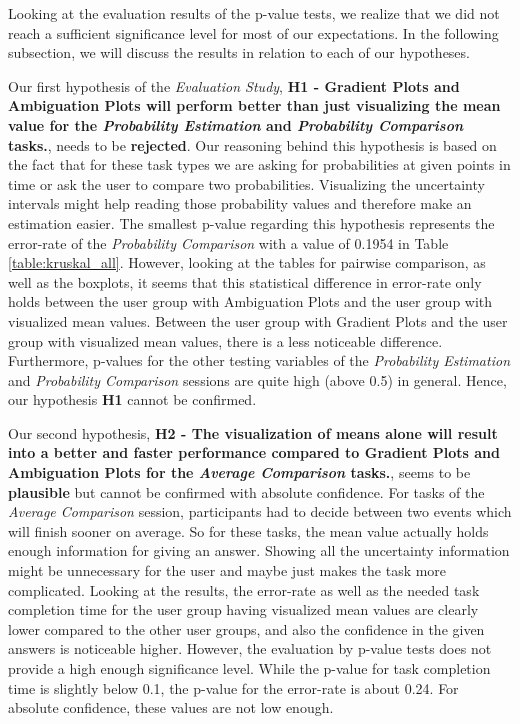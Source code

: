 Looking at the evaluation results of the p-value tests, we realize that we did not reach a sufficient significance level for most of our expectations. In the following subsection, we will discuss the results in relation to each of our hypotheses. \par \medskip

Our first hypothesis of the \textit{Evaluation Study}, \textbf{H1 - Gradient Plots and Ambiguation Plots will perform better than just visualizing the mean value for the \textit{Probability Estimation} and \textit{Probability Comparison} tasks.}, needs to be \textbf{rejected}. Our reasoning behind this hypothesis is based on the fact that for these task types we are asking for probabilities at given points in time or ask the user to compare two probabilities. Visualizing the uncertainty intervals might help reading those probability values and therefore make an estimation easier. The smallest p-value regarding this hypothesis represents the error-rate of the \textit{Probability Comparison} with a value of 0.1954 in Table \ref{table:kruskal_all}. However, looking at the tables for pairwise comparison, as well as the boxplots, it seems that this statistical difference in error-rate only holds between the user group with Ambiguation Plots and the user group with visualized mean values. Between the user group with Gradient Plots and the user group with visualized mean values, there is a less noticeable difference. Furthermore, p-values for the other testing variables of the \textit{Probability Estimation} and \textit{Probability Comparison} sessions are quite high (above 0.5) in general. Hence, our hypothesis \textbf{H1} cannot be confirmed. \par \medskip

Our second hypothesis, \textbf{H2 - The visualization of means alone will result into a better and faster performance compared to Gradient Plots and Ambiguation Plots for the \textit{Average Comparison} tasks.}, seems to be \textbf{plausible} but cannot be confirmed with absolute confidence. For tasks of the \textit{Average Comparison} session, participants had to decide between two events which will finish sooner on average. So for these tasks, the mean value actually holds enough information for giving an answer. Showing all the uncertainty information might be unnecessary for the user and maybe just makes the task more complicated. Looking at the results, the error-rate as well as the needed task completion time for the user group having visualized mean values are clearly lower compared to the other user groups, and also the confidence in the given answers is noticeable higher. However, the evaluation by p-value tests does not provide a high enough significance level. While the p-value for task completion time is slightly below 0.1, the p-value for the error-rate is about 0.24. For absolute confidence, these values are not low enough. \par \medskip

